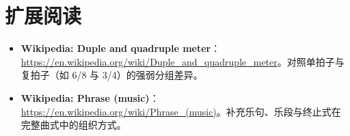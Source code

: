 \section*{扩展阅读}
\begin{itemize}
  \item \textbf{Wikipedia: Duple and quadruple meter}：\url{https://en.wikipedia.org/wiki/Duple_and_quadruple_meter}。对照单拍子与复拍子（如 6/8 与 3/4）的强弱分组差异。
  \item \textbf{Wikipedia: Phrase (music)}：\url{https://en.wikipedia.org/wiki/Phrase_(music)}。补充乐句、乐段与终止式在完整曲式中的组织方式。
\end{itemize}

